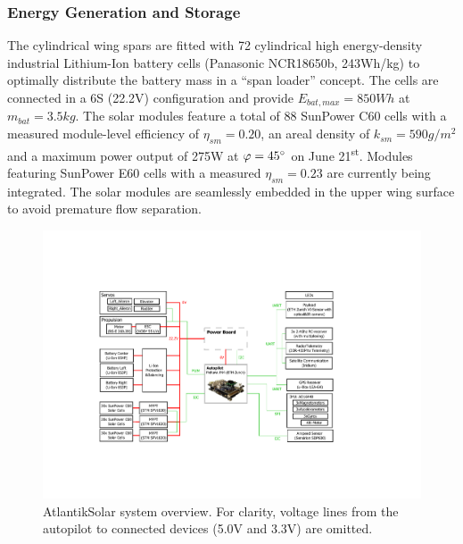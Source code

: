 \subsubsection{Energy Generation and Storage}
The cylindrical wing spars are fitted with 72 cylindrical high energy-density industrial Lithium-Ion battery cells (Panasonic NCR18650b, 243Wh/kg) to optimally distribute the battery mass in a ``span loader'' concept. The cells are connected in a 6S (22.2V) configuration and provide $E_{bat,max}=850Wh$ at $m_{bat}=3.5kg$. The solar modules feature a total of 88 SunPower C60 cells with a measured module-level efficiency of $\eta_{sm}=0.20$, an areal density of $k_{sm}=590g/m^2$ and a maximum power output of 275W at $\varphi=45\degree$ on June 21\textsuperscript{st}. Modules featuring SunPower E60 cells with a measured \cite{Sunier_EPFLSolarModules} $\eta_{sm}=0.23$ are currently being integrated. The solar modules are seamlessly embedded in the upper wing surface to avoid premature flow separation.

\begin{figure}[tb]
    \centering
     \includegraphics[width=\linewidth]{images/8_AtlantikSolar_Avionics}
    \caption{AtlantikSolar system overview. For clarity, voltage lines from the autopilot to connected devices (5.0V and 3.3V) are omitted.}
    \label{fig:AtlantikSolar_SystemOverview}
\end{figure}

